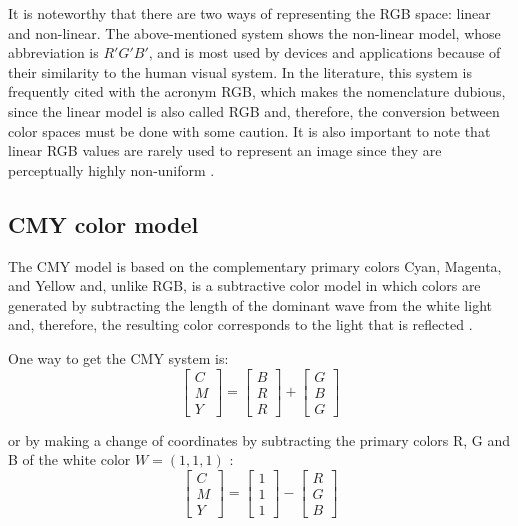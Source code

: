 It is noteworthy that there are two ways of representing the RGB space: linear and non-linear. The above-mentioned system shows the non-linear model, whose abbreviation is $R'G'B'$, and is most used by devices and applications because of their similarity to the human visual system. In the literature, this system is frequently cited with the acronym RGB, which makes the nomenclature dubious, since the linear model is also called RGB and, therefore, the conversion between color spaces must be done with some caution. It is also important to note that linear RGB values are rarely used to represent an image since they are perceptually highly non-uniform \citep{konstantinos:00}.


\subsection{CMY color model}
\label{sec:modelo_cores_cmy}

The CMY model is based on the complementary primary colors Cyan, Magenta, and Yellow and, unlike RGB, is a subtractive color model in which colors are generated by subtracting the length of the dominant wave from the white light and, therefore, the resulting color corresponds to the light that is reflected \citep{gonzalez:02}.

One way to get the CMY system is:\\
\begin{equation}
  \begin{bmatrix}
    C \\ M \\ Y
  \end{bmatrix} = 
  \begin{bmatrix}
    B \\ R \\ R
  \end{bmatrix} +
  \begin{bmatrix}
    G \\ B \\ G
  \end{bmatrix}
\end{equation}

\noindent or by making a change of coordinates by subtracting the primary colors R, G and B of the white color $W = (1, 1, 1)$ \citep{gonzalez:02}:
\begin{equation}
  \begin{bmatrix}
    C \\ M \\ Y
  \end{bmatrix} = 
  \begin{bmatrix}
    1 \\ 1 \\ 1
  \end{bmatrix} -
  \begin{bmatrix}
    R \\ G \\ B
  \end{bmatrix}
\end{equation}


